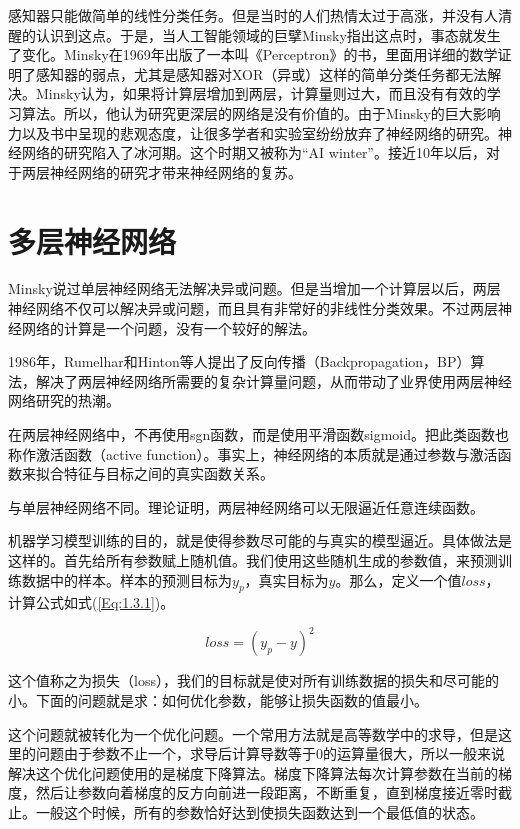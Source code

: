 \documentclass[UTF-8]{progbookcn}
\begin{document}
感知器只能做简单的线性分类任务。但是当时的人们热情太过于高涨，并没有人清醒的认识到这点。于是，当人工智能领域的巨擘Minsky指出这点时，事态就发生了变化。Minsky在1969年出版了一本叫《Perceptron》的书，里面用详细的数学证明了感知器的弱点，尤其是感知器对XOR（异或）这样的简单分类任务都无法解决\cite{Pollack_bookreview:}。Minsky认为，如果将计算层增加到两层，计算量则过大，而且没有有效的学习算法。所以，他认为研究更深层的网络是没有价值的。由于Minsky的巨大影响力以及书中呈现的悲观态度，让很多学者和实验室纷纷放弃了神经网络的研究。神经网络的研究陷入了冰河期。这个时期又被称为“AI winter”。接近10年以后，对于两层神经网络的研究才带来神经网络的复苏。



\section{多层神经网络}
Minsky说过单层神经网络无法解决异或问题。但是当增加一个计算层以后，两层神经网络不仅可以解决异或问题，而且具有非常好的非线性分类效果。不过两层神经网络的计算是一个问题，没有一个较好的解法。

1986年，Rumelhar和Hinton等人提出了反向传播（Backpropagation，BP）算法，解决了两层神经网络所需要的复杂计算量问题，从而带动了业界使用两层神经网络研究的热潮\cite{BP}。

在两层神经网络中，不再使用sgn函数，而是使用平滑函数sigmoid。把此类函数也称作激活函数（active function）。事实上，神经网络的本质就是通过参数与激活函数来拟合特征与目标之间的真实函数关系。


与单层神经网络不同。理论证明，两层神经网络可以无限逼近任意连续函数。

机器学习模型训练的目的，就是使得参数尽可能的与真实的模型逼近。具体做法是这样的。首先给所有参数赋上随机值。我们使用这些随机生成的参数值，来预测训练数据中的样本。样本的预测目标为$y_p$，真实目标为$y$。那么，定义一个值$loss$，计算公式如式(\ref{Eq:1.3.1})。

\begin{equation}\label{Eq:1.3.1}
  loss = (y_p - y)^2
\end{equation}

这个值称之为损失（loss），我们的目标就是使对所有训练数据的损失和尽可能的小。下面的问题就是求：如何优化参数，能够让损失函数的值最小。

这个问题就被转化为一个优化问题。一个常用方法就是高等数学中的求导，但是这里的问题由于参数不止一个，求导后计算导数等于0的运算量很大，所以一般来说解决这个优化问题使用的是梯度下降算法。梯度下降算法每次计算参数在当前的梯度，然后让参数向着梯度的反方向前进一段距离，不断重复，直到梯度接近零时截止。一般这个时候，所有的参数恰好达到使损失函数达到一个最低值的状态。
\end{document}
